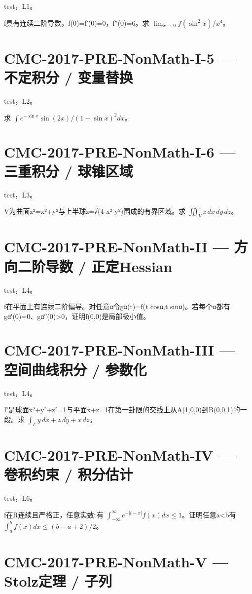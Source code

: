 \documentclass[UTF8]{ctexart}
\begin{document}
test，L1。

f具有连续二阶导数，f(0)=f′(0)=0，f″(0)=6。求 $\lim_{x\to0}f(\sin^2x)/x^4$。

\section*{CMC-2017-PRE-NonMath-I-5 — 不定积分 / 变量替换}

test，L2。

求 $\int e^{-\sin x}\sin(2x)/(1-\sin x)^2 dx$。

\section*{CMC-2017-PRE-NonMath-I-6 — 三重积分 / 球锥区域}

test，L3。

V为曲面z²=x²+y²与上半球z=√(4-x²-y²)围成的有界区域。求 $\iiint_Vz\,dx\,dy\,dz$。

\section*{CMC-2017-PRE-NonMath-II — 方向二阶导数 / 正定Hessian}

test，L4。

f在平面上有连续二阶偏导。对任意α令gα(t)=f(t cosα,t sinα)。若每个α都有gα′(0)=0、gα″(0)>0，证明f(0,0)是局部极小值。

\section*{CMC-2017-PRE-NonMath-III — 空间曲线积分 / 参数化}

test，L4。

Γ是球面x²+y²+z²=1与平面x+z=1在第一卦限的交线上从A(1,0,0)到B(0,0,1)的一段。求 $\int_\Gamma y\,dx+z\,dy+x\,dz$。

\section*{CMC-2017-PRE-NonMath-IV — 卷积约束 / 积分估计}

test，L6。

f在R连续且严格正，任意实数t有 $\int_{-\infty}^\infty e^{-|t-x|}f(x)dx\le1$。证明任意a<b有 $\int_a^bf(x)dx\le(b-a+2)/2$。

\section*{CMC-2017-PRE-NonMath-V — Stolz定理 / 子列}
\end{document}
